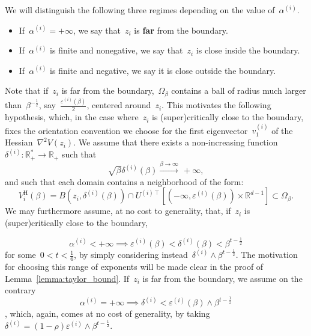 \documentclass[10pt]{article}
\newcommand{\R}{\mathbb{R}}
\newcommand{\1}{\mathbbm 1}
\newcommand{\epsBoundary}[1]{\varepsilon^{(#1)}} %
\newcommand{\deltaRadius}[1]{\delta^{(#1)}} %
\newcommand{\epsLimit}[1]{\alpha^{(#1)}} %
\newcommand{\scalingExp}{t}
\newcommand{\shift}{\rho} %
\newcommand{\deltai}{\delta^{(i)}}
\begin{document}
    We will distinguish the following three regimes depending on the value of~$\epsLimit{i}$.
    \begin{itemize}
        \item If~$\epsLimit{i}= +\infty$, we say that~$z_i$ is {\bf far} from the boundary.
        \item If~$\epsLimit{i}$ is finite and nonegative, we say that~$z_i$ is close inside the boundary.
        \item If~$\epsLimit{i}$ is finite and negative, we say it is close outside the boundary.
    \end{itemize}
    Note that if~$z_i$ is far from the boundary,~$\Omega_\beta$ contains a ball of radius much larger than~$\beta^{-\frac12}$, say~$\frac{\epsBoundary{i}(\beta)}2$, centered around~$z_i$.
    This motivates the following hypothesis, which, in the case where~$z_i$ is (super)critically close to the boundary, fixes the orientation convention we choose for the first eigenvector~$v_1^{(i)}$ of the Hessian~$\nabla^2 V(z_i)$.
    We assume that there exists a non-increasing function~$\deltai :\R_+^*\to\R_+$ such that
    \begin{equation}
        \label{eq:supercritical_scaling_delta}
        \tag{\bf H1}
        \sqrt\beta\deltaRadius{i}(\beta)\overset{\beta\to\infty}{\longrightarrow}\,+\infty,
    \end{equation}
    and such that each domain contains a neighborhood of the form:
    \begin{equation}
        \tag{\bf H2}
        \label{eq:capped_ball_neighborhood}
        V_i^{\mathrm H}(\beta) = B(z_i,\deltaRadius{i}(\beta)) \cap U^{(i)\intercal}\left[(-\infty,\epsBoundary{i}(\beta))\times \R^{d-1}\right] \subset \Omega_\beta.
    \end{equation}
    We may furthermore assume, at no cost to generality, that, if~$z_i$ is (super)critically close to the boundary,

    \begin{equation}
        \tag{\bf H3}
        \label{eq:deltai_polybound_close}
        \epsLimit{i} < +\infty \implies \epsBoundary{i}(\beta)<\deltaRadius{i}(\beta) < \beta^{\scalingExp-\frac12}
    \end{equation}
    for some~$0<\scalingExp<\frac16$, by simply considering instead~$\deltaRadius{i} \land \beta^{\scalingExp-\frac12}$.
    The motivation for choosing this range of exponents will be made clear in the proof of Lemma~\ref{lemma:taylor_bound}. 
    If~$z_i$ is far from the boundary, we assume on the contrary
    \begin{equation}
        \tag{\bf H3'}
        \label{eq:deltai_polybound_far}
        \epsLimit{i}=+\infty\implies\deltaRadius{i}<\epsBoundary{i}(\beta)\land\beta^{\scalingExp-\frac12}
    \end{equation}, which, again, comes at no cost of generality, by taking~$\deltaRadius{i} = (1-\shift)\epsBoundary{i}\land\beta^{\scalingExp-\frac12}$.
\end{document}
